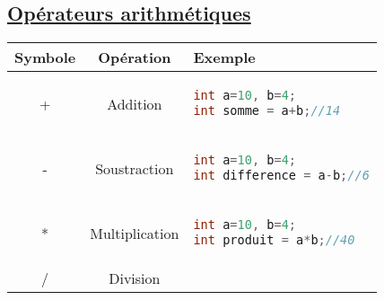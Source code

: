 \documentclass[a3paper,12pt]{article}
\begin{document}
\begin{minipage}[t]{0.49\textwidth}
\vspace{0pt}
\begin{tcolorbox}[title=Opérations de base, fonttitle=\large, top=0pt, bottom=3pt, boxsep=1pt,
colback=white,
  colframe=pink!80!white,, 
  colbacktitle=pink!80!white,
  coltitle=white,]
\vspace{0.5em}
\subsection*{{\small \underline{Opérateurs arithmétiques}}}

\begin{tabular}{|c|c|p{7cm}|}
\hline
\textbf{Symbole} & \textbf{Opération} & \textbf{Exemple} \\
\hline
+ & Addition & 
\begin{minipage}[t]{6.5cm}
\vspace{-\baselineskip}
\begin{lstlisting}[language=C, basicstyle=\normalsize , aboveskip=5pt, belowskip=20pt]
int a=10, b=4;
int somme = a+b;//14
\end{lstlisting}
\vspace{-\baselineskip}
\end{minipage} \\
\hline
- & Soustraction & 
\begin{minipage}[t]{6.5cm}
\vspace{-\baselineskip}
\begin{lstlisting}[language=C, basicstyle=\normalsize , aboveskip=5pt, belowskip=20pt]
int a=10, b=4;
int difference = a-b;//6
\end{lstlisting}
\vspace{-\baselineskip}
\end{minipage} \\
\hline
* & Multiplication & 
\begin{minipage}[t]{6.5cm}
\vspace{-\baselineskip}
\begin{lstlisting}[language=C, basicstyle=\normalsize , aboveskip=5pt, belowskip=20pt]
int a=10, b=4;
int produit = a*b;//40
\end{lstlisting}
\vspace{-\baselineskip}
\end{minipage} \\
\hline
/ & Division & 
\begin{minipage}[t]{6.5cm}
\vspace{-\baselineskip}

\end{minipage}
\end{tabular}
\end{tcolorbox}
\end{minipage}
\end{document}
